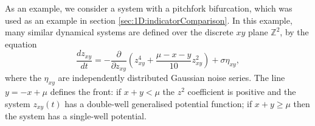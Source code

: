 As an example, we consider a system with a pitchfork bifurcation, which was used as an example in section \ref{sec:1D:indicatorComparison}. In this example, many similar dynamical systems are defined over the discrete $xy$ plane $\mathbb{Z}^2$, by the equation 
	\begin{equation}
		\frac{dz_{xy}}{dt} = -\frac{\partial}{\partial z_{xy}}\left(z_{xy}^4+\frac{\mu-x-y}{10}z_{xy}^2\right)+\sigma\eta_{xy},
	\label{eqn:propagatingPitchfork}
	\end{equation}
where the $\eta_{xy}$ are independently distributed Gaussian noise series. The line $y=-x+\mu$ defines the front: if $x+y<\mu$ the $z^2$ coefficient is positive and the system $z_{xy}(t)$ has a double-well generalised potential function; if $x+y\geq\mu$ then the system has a single-well potential. 

